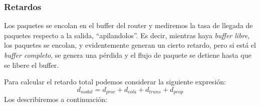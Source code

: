 \subsubsection{Retardos}
\noindent Los paquetes se encolan en el buffer del router y mediremos la tasa de llegada de paquetes respecto a la salida, ``apilandolos''. Es decir, mientras haya \textit{buffer libre}, los paquetes se encolan, y evidentemente generan un cierto retardo, pero si está el \textit{buffer completo}, se genera una pérdida y el flujo de paquete se detiene hasta que se libere el buffer.\par \vspace{.5cm}
\noindent Para calcular el retardo total podemos considerar la siguiente expresión:
\[
        \boxed{d_{nodal} = d_{proc} + d_{cola} + d_{trans} + d_{prop}}
\]
\noindent Los describiremos a continuación:
